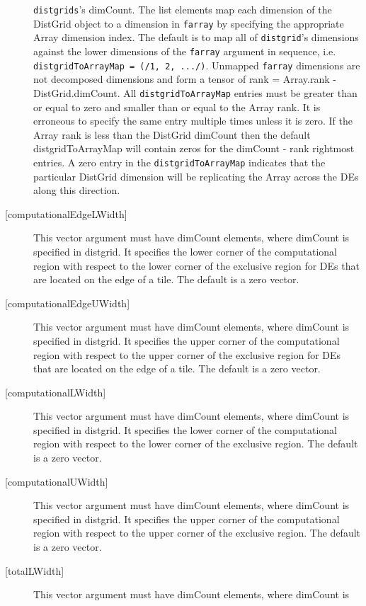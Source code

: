 \begin{description}
   {\tt distgrids}'s dimCount. The list elements map each dimension of 
   the DistGrid object to a dimension in {\tt farray} by specifying the 
   appropriate Array dimension index. The default is to map all of 
   {\tt distgrid}'s dimensions against the lower dimensions of the 
   {\tt farray} argument in sequence, i.e. {\tt distgridToArrayMap = 
   (/1, 2, .../)}. 
   Unmapped {\tt farray} dimensions are not decomposed dimensions and 
   form a tensor of rank = Array.rank - DistGrid.dimCount. 
   All {\tt distgridToArrayMap} entries must be greater than or equal 
   to zero and smaller than or equal to the Array rank. It is erroneous 
   to specify the same entry multiple times unless it is zero. 
   If the Array rank is less than the DistGrid dimCount then the default 
   distgridToArrayMap will contain zeros for the dimCount - rank 
   rightmost entries. A zero entry in the {\tt distgridToArrayMap} 
   indicates that the particular DistGrid dimension will be replicating 
   the Array across the DEs along this direction. 
   \item[{[computationalEdgeLWidth]}] 
   This vector argument must have dimCount elements, where dimCount is 
   specified in distgrid. It specifies the lower corner of the computational 
   region with respect to the lower corner of the exclusive region for DEs 
   that are located on the edge of a tile. 
   The default is a zero vector. 
   \item[{[computationalEdgeUWidth]}] 
   This vector argument must have dimCount elements, where dimCount is 
   specified in distgrid. It specifies the upper corner of the computational 
   region with respect to the upper corner of the exclusive region for DEs 
   that are located on the edge of a tile. 
   The default is a zero vector. 
   \item[{[computationalLWidth]}] 
   This vector argument must have dimCount elements, where dimCount is 
   specified in distgrid. It specifies the lower corner of the computational 
   region with respect to the lower corner of the exclusive region. 
   The default is a zero vector. 
   \item[{[computationalUWidth]}] 
   This vector argument must have dimCount elements, where dimCount is 
   specified in distgrid. It specifies the upper corner of the computational 
   region with respect to the upper corner of the exclusive region. 
   The default is a zero vector. 
   \item[{[totalLWidth]}] 
   This vector argument must have dimCount elements, where dimCount is 

\end{description}
